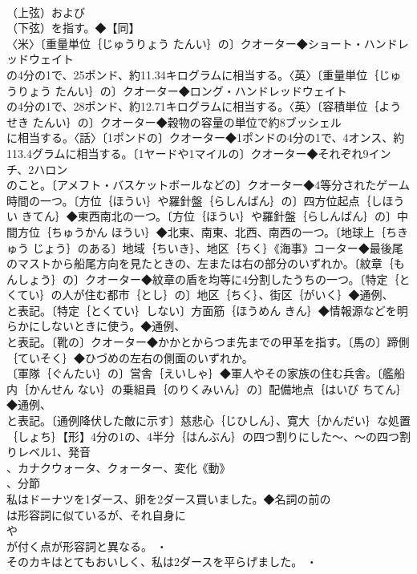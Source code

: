 \documentclass[8pt]{extreport}
\begin{document}
\begin{CJK}{UTF8}{min}
\\	（上弦）および
\\	（下弦）を指す。◆【同】
\\	〈米〉〔重量単位｛じゅうりょう たんい｝の〕クオーター◆ショート・ハンドレッドウェイト
\\	の4分の1で、25ポンド、約11.34キログラムに相当する。〈英〉〔重量単位｛じゅうりょう たんい｝の〕クオーター◆ロング・ハンドレッドウェイト
\\	の4分の1で、28ポンド、約12.71キログラムに相当する。〈英〉〔容積単位｛ようせき たんい｝の〕クオーター◆穀物の容量の単位で約8ブッシェル
\\	に相当する。〈話〉〔1ポンドの〕クオーター◆1ポンドの4分の1で、4オンス、約113.4グラムに相当する。〔1ヤードや1マイルの〕クオーター◆それぞれ9インチ、2ハロン
\\	のこと。〔アメフト・バスケットボールなどの〕クオーター◆4等分されたゲーム時間の一つ。〔方位｛ほうい｝や羅針盤｛らしんばん｝の〕四方位起点｛しほうい きてん｝◆東西南北の一つ。〔方位｛ほうい｝や羅針盤｛らしんばん｝の〕中間方位｛ちゅうかん ほうい｝◆北東、南東、北西、南西の一つ。〔地球上｛ちきゅう じょう｝のある〕地域｛ちいき｝、地区｛ちく｝《海事》コーター◆最後尾のマストから船尾方向を見たときの、左または右の部分のいずれか。〔紋章｛もんしょう｝の〕クオーター◆紋章の盾を均等に4分割したうちの一つ。〔特定｛とくてい｝の人が住む都市｛とし｝の〕地区｛ちく｝、街区｛がいく｝◆通例、
\\	と表記。〔特定｛とくてい｝しない〕方面筋｛ほうめん きん｝◆情報源などを明らかにしないときに使う。◆通例、
\\	と表記。〔靴の〕クオーター◆かかとからつま先までの甲革を指す。〔馬の〕蹄側｛ていそく｝◆ひづめの左右の側面のいずれか。
\\	〔軍隊｛ぐんたい｝の〕営舎｛えいしゃ｝◆軍人やその家族の住む兵舎。〔艦船内｛かんせん ない｝の乗組員｛のりくみいん｝の〕配備地点｛はいび ちてん｝◆通例、
\\	と表記。〔通例降伏した敵に示す〕慈悲心｛じひしん｝、寛大｛かんだい｝な処置｛しょち｝【形】4分の1の、4半分｛はんぶん｝の四つ割りにした～、～の四つ割りレベル1、発音
\\	、カナクウォータ、クォーター、変化《動》
\\	、分節
\\	私はドーナツを1ダース、卵を2ダース買いました。◆名詞の前の
\\	は形容詞に似ているが、それ自身に
\\	や
\\	が付く点が形容詞と異なる。 ・
\\	そのカキはとてもおいしく、私は2ダースを平らげました。 ・

\end{CJK}
\end{document}
